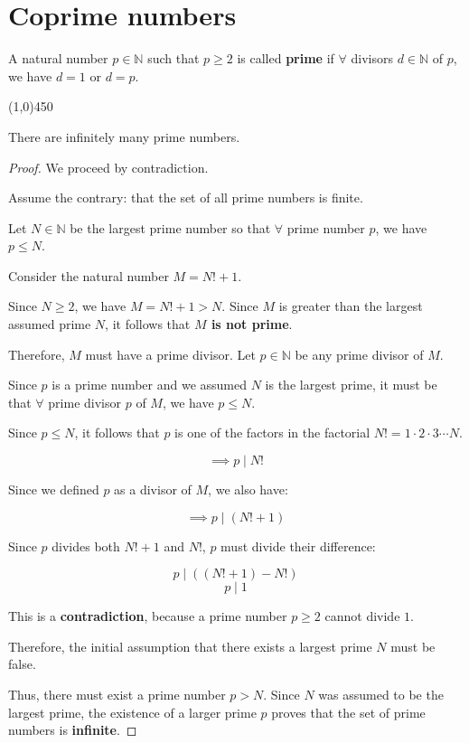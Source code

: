 \section{Coprime numbers}
\begin{definition}
    A natural number $p \in \mathbb{N}$ such that $p \ge 2$ is called \textbf{prime} if $\forall$ divisors $d \in \mathbb{N}$ of $p$, we have $d=1$ or $d=p$.
\end{definition}

    \begin{center}
        \vspace{10pt}
        \line(1,0){450}
        \vspace{25pt}
    \end{center}

\begin{theorem}[Euclid]
    There are infinitely many prime numbers.
\end{theorem}

\begin{proof}
    We proceed by contradiction.
    
    Assume the contrary: that the set of all prime numbers is finite.
    
    Let $N \in \mathbb{N}$ be the largest prime number so that $\forall$ prime number $p$, we have $p \le N$.
    
    Consider the natural number $M = N! + 1$.
    
    Since $N \ge 2$, we have $M = N! + 1 > N$. Since $M$ is greater than the largest assumed prime $N$, it follows that \textbf{$M$ is not prime}.
    
    Therefore, $M$ must have a prime divisor. Let $p \in \mathbb{N}$ be any prime divisor of $M$.
    
    Since $p$ is a prime number and we assumed $N$ is the largest prime, it must be that $\forall$ prime divisor $p$ of $M$, we have $p \le N$.
    
    Since $p \le N$, it follows that $p$ is one of the factors in the factorial $N! = 1 \cdot 2 \cdot 3 \cdots N$.
    
    $$\implies p \mid N!$$
    
    Since we defined $p$ as a divisor of $M$, we also have:
    
    $$\implies p \mid (N! + 1)$$
    
    Since $p$ divides both $N! + 1$ and $N!$, $p$ must divide their difference:
    
    $$p \mid ((N! + 1) - N!)$$
    $$p \mid 1$$
    
    This is a \textbf{contradiction}, because a prime number $p \ge 2$ cannot divide $1$.
    
    Therefore, the initial assumption that there exists a largest prime $N$ must be false.
    
    Thus, there must exist a prime number $p > N$. Since $N$ was assumed to be the largest prime, the existence of a larger prime $p$ proves that the set of prime numbers is \textbf{infinite}.
\end{proof}

